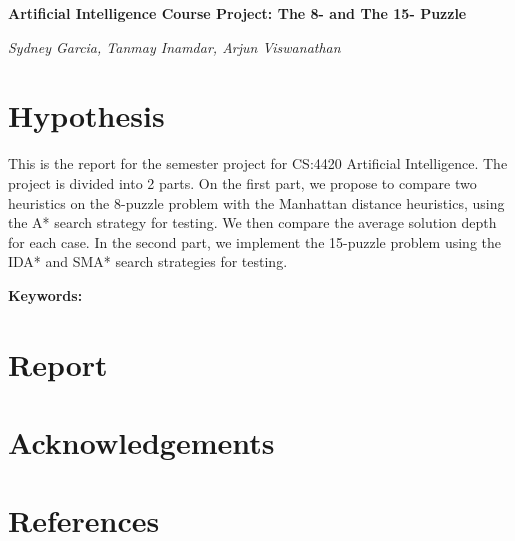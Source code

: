 \documentclass{article}
\begin{document}
	\begin{center}
		\Large \textbf{Artificial Intelligence Course Project: The 8- and The 15- Puzzle}
	\end{center}
	\begin{center}
		\textit{Sydney Garcia, Tanmay Inamdar, Arjun Viswanathan}
	\end{center}

	\section{Hypothesis}
		This is the report for the semester project for CS:4420 Artificial Intelligence. The project is divided into 2 parts. On the first part, we propose to compare two heuristics on the 8-puzzle problem with the Manhattan distance heuristics, using the A* search strategy for testing. We then compare the average solution depth for each case. In the second part, we implement the 15-puzzle problem using the IDA* and SMA* search strategies for testing. \linebreak \linebreak
		
		\textbf{Keywords: } \linebreak
		
	\section{Report}
	
	\section{Acknowledgements}
	
	\section{References}
\end{document}
